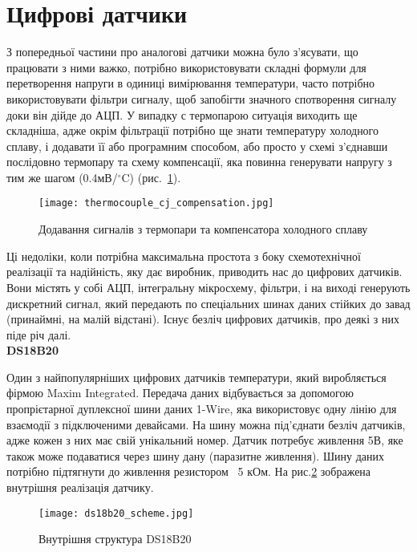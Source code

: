 \section{Цифрові датчики}

З попередньої частини про аналогові датчики можна було з'ясувати, що працювати з ними важко, потрібно використовувати складні формули для перетворення напруги в одиниці вимірювання температури, часто потрібно використовувати фільтри сигналу, щоб запобігти значного спотворення сигналу доки він дійде до АЦП. У випадку с термопарою ситуація виходить ще складніша, адже окрім фільтрації потрібно ще знати температуру холодного сплаву, і додавати її або програмним способом, або просто у схемі з'єднавши послідовно термопару та схему компенсації, яка повинна генерувати напругу з тим же шагом (0.4мВ/$^\circ$C) (рис.~\ref{fig:thermocuple_cold_junction_compensation}).
\enlargethispage{\baselineskip}

\begin{figure}[ht]
    \centering
    \texttt{[image: thermocouple\_cj\_compensation.jpg]}
    \caption{Додавання сигналів з термопари та компенсатора холодного сплаву}
    \label{fig:thermocuple_cold_junction_compensation}
\end{figure}

Ці недоліки, коли потрібна максимальна простота з боку схемотехнічної реалізації та надійність, яку дає виробник, приводить нас до цифрових датчиків. Вони містять у собі АЦП, інтегральну мікросхему, фільтри, і на виході генерують дискретний сигнал, який передають по спеціальних шинах даних стійких до завад (принаймні, на малій відстані). Існує безліч цифрових датчиків, про деякі з них піде річ далі.\\

\textbf{DS18B20}\bigskip

Один з найпопулярніших цифрових датчиків температури, який виробляється фірмою Maxim Integrated. Передача даних відбувається за допомогою пропрієтарної дуплексної шини даних 1-Wire, яка використовує одну лінію для взаємодії з підключеними девайсами. На шину можна під'єднати безліч датчиків, адже кожен з них має свій унікальний номер. Датчик потребує живлення 5В, яке також може подаватися через шину дану (паразитне живлення). Шину даних потрібно підтягнути до живлення резистором ~5 кОм. На рис.\ref{fig:ds18b20_scheme} зображена внутрішня реалізація датчику.

\begin{figure}[ht]
    \centering
    \texttt{[image: ds18b20\_scheme.jpg]}
    \caption{Внутрішня структура DS18B20}
    \label{fig:ds18b20_scheme}
\end{figure}

